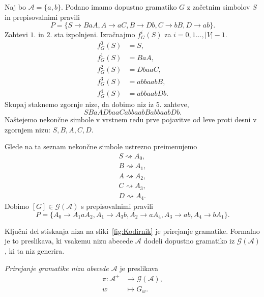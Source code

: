 \documentclass[fin1, tisk]{fmfdelo}
\providecommand{\abs}[1]{\left\lvert #1 \right\rvert}
\newcommand{\A}{\mathcal{A}}
\newcommand{\G}{\mathcal{G}}
\theoremstyle{definition}
\begin{document}
\begin{primer}\label{primer:kanonična}
    Naj bo $\A = \{ a,b \}$. Podano imamo dopustno gramatiko $G$ z začetnim simbolov $S$ in 
    prepisovalnimi pravili
    \[
        P = \{ S \rightarrow \mathit{BaA}, A \rightarrow \mathit{aC}, B \rightarrow 
        \mathit{Db}, C \rightarrow \mathit{bB}, D \rightarrow{ab} \}.
    \]
    Zahtevi $1.$ in $2.$ sta izpolnjeni. Izračnajmo $f^i_G(S)$ za $i = 0,1 \ldots, \abs{V} - 1$.
    \begin{align*}
        f_G^0(S) &= S, \\
        f_G^1(S) &= \mathit{BaA}, \\
        f^2_G(S) &= \mathit{DbaaC}, \\
        f^3_G(S) &= \mathit{abbaabB}, \\
        f^4_G(S) &= \mathit{abbaabDb}.
    \end{align*}
    Skupaj staknemo zgornje nize, da dobimo niz iz $5.$ zahteve,
    \[
        \mathit{SBaADbaaCabbaabBabbaabDb}.
    \]
    Naštejemo nekončne simbole v vrstnem redu prve pojavitve od leve proti desni v zgornjem nizu:
    $S, B, A, C, D$. 
    
    Glede na ta seznam nekončne simbole ustrezno preimenujemo
    \begin{gather*}
        S \rightsquigarrow A_0, \\
        B \rightsquigarrow A_1, \\
        A \rightsquigarrow A_2, \\
        C \rightsquigarrow A_3, \\
        D \rightsquigarrow A_4.
    \end{gather*}
    Dobimo $[G] \in \G(\A)$ s prepisovalnimi pravili
    \[
        P = \{ A_0 \rightarrow A_1aA_2, A_1 \rightarrow A_3b, A_2 \rightarrow aA_4,
        A_3 \rightarrow ab, A_4 \rightarrow bA_1 \}.
    \]
\end{primer}

Ključni del stiskanja niza na sliki~\ref{fig:Kodirnik} je prirejanje gramatike. Formalno je 
to preslikava, ki vsakemu nizu abecede $\A$ dodeli dopustno gramatiko iz $\G(\A)$, ki ta niz 
generira.

\begin{definicija}
    \emph{Prirejanje gramatike nizu abecede $\A$} je preslikava
    \begin{align*}
        \pi \colon \A^+ &\to \G(\A), \\
        w &\mapsto G_w.
    \end{align*}
\end{definicija}
\end{document}
